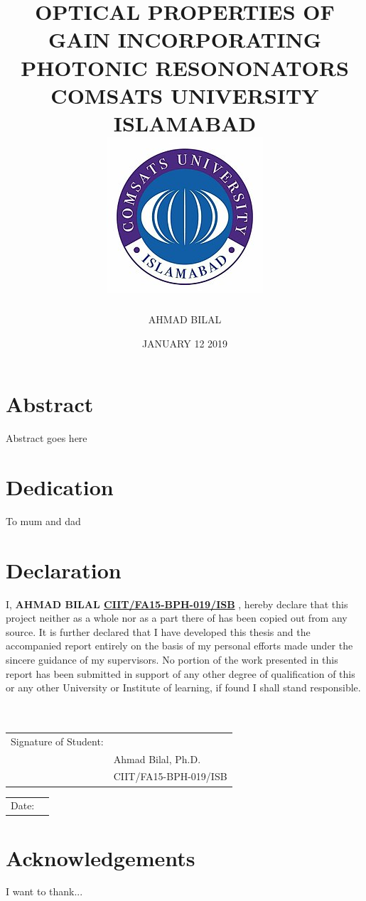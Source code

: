 \documentclass[12pt]{report}
\title{
	{OPTICAL PROPERTIES OF GAIN INCORPORATING PHOTONIC RESONONATORS}\\
	{\large COMSATS UNIVERSITY ISLAMABAD}\\
	{\includegraphics{university.jpg}}
}
\author{AHMAD BILAL}
\date{JANUARY 12 2019}
\begin{document}
\maketitle

\chapter*{Abstract}
Abstract goes here
 
\chapter*{Dedication}
To mum and dad
 
\chapter*{Declaration}
I, \textbf{AHMAD BILAL \underline{CIIT/FA15-BPH-019/ISB}} , hereby declare that this project
neither as a whole nor as a part there of has been copied out from any source. It is
further declared that I have developed this thesis and the accompanied report entirely
on the basis of my personal efforts made under the sincere guidance of my supervisors.
No portion of the work presented in this report has been submitted in support of any
other degree of qualification of this or any other University or Institute of learning, if
found I shall stand responsible.
\\
\\
\\
\begin{flushleft}
\begin{tabular}{@{}p{1.5in}p{2in}@{}}
Signature of Student:  & \hrulefill \\
& Ahmad Bilal, Ph.D. \\
& CIIT/FA15-BPH-019/ISB\\
\end{tabular}
\end{flushleft}

\begin{flushright}
\begin{tabular}{@{}p{.25in}p{1in}@{}}
Date: & \hrulefill \\
\end{tabular}
\end{flushright}

 
\chapter*{Acknowledgements}
I want to thank...
 
\end{document}
